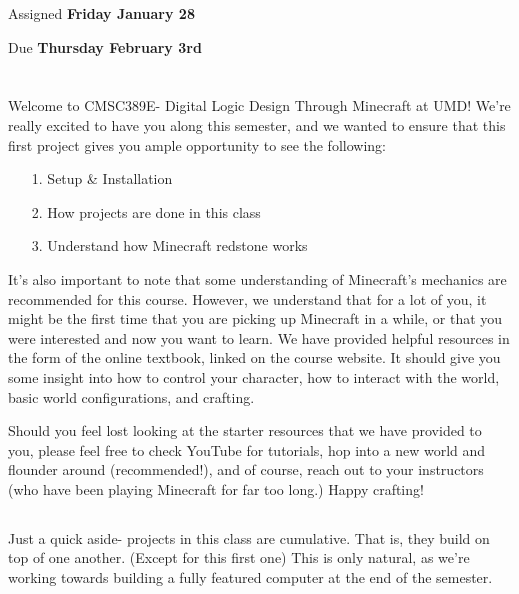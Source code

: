 \documentclass{article}
\begin{document}
\large

{\selectfont{\Huge CMSC389E Project 0: \par Tutorial Island (Or Desert)}}

Assigned \textbf{Friday January 28}

Due \textbf{Thursday February 3rd}

\section{\selectfont{Welcome!}}

Welcome to CMSC389E- Digital Logic Design Through Minecraft at UMD! We're really excited to have you along this semester, and we wanted to ensure that this first project gives you ample opportunity to see the following:

\begin{itemize}
  \item[1.] Setup \& Installation
  \item[2.] How projects are done in this class
  \item[3.] Understand how Minecraft redstone works
\end{itemize}

It's also important to note that some understanding of Minecraft's mechanics are recommended for this course. However, we understand that for a lot of you, it might be the first time that you are picking up Minecraft in a while, or that you were interested and now you want to learn. We have provided helpful resources in the form of the online textbook, linked on the course website. It should give you some insight into how to control your character, how to interact with the world, basic world configurations, and crafting.

Should you feel lost looking at the starter resources that we have provided to you, please feel free to check YouTube for tutorials, hop into a new world and flounder around (recommended!), and of course, reach out to your instructors (who have been playing Minecraft for far too long.) Happy crafting!

\subsection{\selectfont{Projects are Cumulative}}

Just a quick aside- projects in this class are cumulative. That is, they build on top of one another. (Except for this first one) This is only natural, as we're working towards building a fully featured computer at the end of the semester. 
\end{document}
